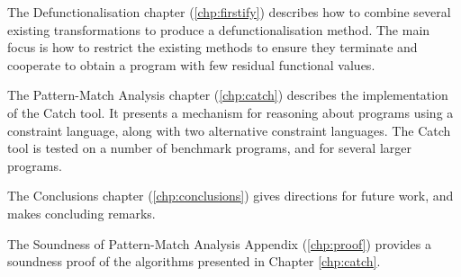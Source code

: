 The Defunctionalisation chapter (\ref{chp:firstify}) describes how to combine several existing transformations to produce a defunctionalisation method. The main focus is how to restrict the existing methods to ensure they terminate and cooperate to obtain a program with few residual functional values.

The Pattern-Match Analysis chapter (\ref{chp:catch}) describes the implementation of the Catch tool. It presents a mechanism for reasoning about programs using a constraint language, along with two alternative constraint languages. The Catch tool is tested on a number of benchmark programs, and for several larger programs.

The Conclusions chapter (\ref{chp:conclusions}) gives directions for future work, and makes concluding remarks.

The Soundness of Pattern-Match Analysis Appendix (\ref{chp:proof}) provides a soundness proof of the algorithms presented in Chapter \ref{chp:catch}.


